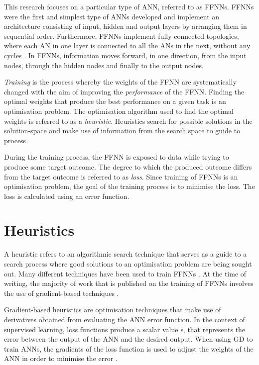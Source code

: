 \documentclass[preprint,review,12pt]{elsarticle}
\begin{document}
This research focuses on a particular type of \acs{ANN}, referred to as \acfp{FFNN}. \acp{FFNN} were the first and simplest type of \acp{ANN} developed \citep{ref:schmidhuber:2015} and implement an architecture consisting of input, hidden and output layers by arranging them in sequential order. Furthermore, \acp{FFNN} implement fully connected topologies, where each \acs{AN} in one layer is connected to all the \acp{AN} in the next, without any cycles \citep{ref:zell:1994}. In \acp{FFNN}, information moves forward, in one direction, from the input nodes, through the hidden nodes and finally to the output nodes.

\textit{Training} is the process whereby the weights of the \acs{FFNN} are systematically changed with the aim of improving the \textit{performance} of the \acs{FFNN}. Finding the optimal weights that produce the best performance on a given task is an optimisation problem. The optimisation algorithm used to find the optimal weights is referred to as a \textit{heuristic}. Heuristics search for possible solutions in the solution-space and make use of information from the search space to guide to process.

During the training process, the \acs{FFNN} is exposed to data while trying to produce some target outcome. The degree to which the produced outcome differs from the target outcome is referred to as \textit{loss}. Since training of \acp{FFNN} is an optimisation problem, the goal of the training process is to minimise the loss. The loss is calculated using an error function.

\section{Heuristics}
\label{sec:heuristics}

A heuristic refers to an algorithmic search technique that serves as a guide to a search process where good solutions to an optimisation problem are being sought out. Many different techniques have been used to train \acp{FFNN} \citep{ref:kingma:2014}. At the time of writing, the majority of work that is published on the training of \acp{FFNN} involves the use of gradient-based techniques \citep{ref:nel:2021}.

Gradient-based heuristics are optimisation techniques that make use of derivatives obtained from evaluating the \acs{ANN} error function. In the context of supervised learning, loss functions produce a scalar value $\epsilon$, that represents the error between the output of the \acs{ANN} and the desired output. When using \acf{GD} to train \acp{ANN}, the gradients of the loss function is used to adjust the weights of the \acs{ANN} in order to minimise the error \citep{ref:engelbrecht:2007}.
\end{document}
